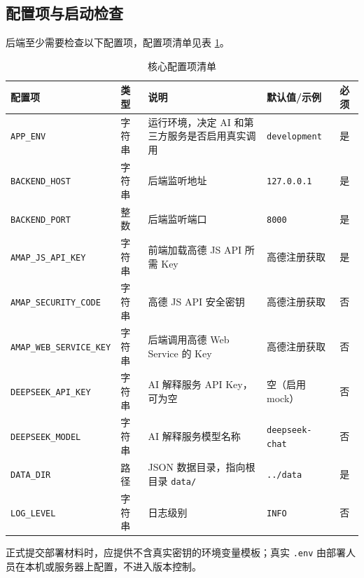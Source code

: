 \subsection{配置项与启动检查}

后端至少需要检查以下配置项，配置项清单见表 \ref{tab:config-items}。

\begin{table}[htbp]
  \centering\small
  \caption{核心配置项清单}
  \label{tab:config-items}
  \begin{tabularx}{\textwidth}{>{\raggedright\arraybackslash}p{2.8cm}|>{\raggedright\arraybackslash}p{1.5cm}|X|>{\raggedright\arraybackslash}p{2.8cm}|>{\raggedright\arraybackslash}p{1.2cm}}
    \toprule
    \textbf{配置项} & \textbf{类型} & \textbf{说明} & \textbf{默认值/示例} & \textbf{必须} \\
    \midrule
    \texttt{APP\_ENV} & 字符串 & 运行环境，决定 AI 和第三方服务是否启用真实调用 & \texttt{development} & 是 \\
    \hline
    \texttt{BACKEND\_HOST} & 字符串 & 后端监听地址 & \texttt{127.0.0.1} & 是 \\
    \hline
    \texttt{BACKEND\_PORT} & 整数 & 后端监听端口 & \texttt{8000} & 是 \\
    \hline
    \texttt{AMAP\_JS\_API\_KEY} & 字符串 & 前端加载高德 JS API 所需 Key & 高德注册获取 & 是 \\
    \hline
    \texttt{AMAP\_SECURITY\_CODE} & 字符串 & 高德 JS API 安全密钥 & 高德注册获取 & 否 \\
    \hline
    \texttt{AMAP\_WEB\_SERVICE\_KEY} & 字符串 & 后端调用高德 Web Service 的 Key & 高德注册获取 & 否 \\
    \hline
    \texttt{DEEPSEEK\_API\_KEY} & 字符串 & AI 解释服务 API Key，可为空 & 空（启用 mock） & 否 \\
    \hline
    \texttt{DEEPSEEK\_MODEL} & 字符串 & AI 解释服务模型名称 & \texttt{deepseek-chat} & 否 \\
    \hline
    \texttt{DATA\_DIR} & 路径 & JSON 数据目录，指向根目录 \texttt{data/} & \texttt{../data} & 是 \\
    \hline
    \texttt{LOG\_LEVEL} & 字符串 & 日志级别 & \texttt{INFO} & 否 \\
    \bottomrule
  \end{tabularx}
\end{table}

正式提交部署材料时，应提供不含真实密钥的环境变量模板；真实 \texttt{.env} 由部署人员在本机或服务器上配置，不进入版本控制。

